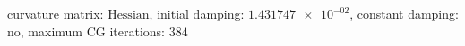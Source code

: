curvature matrix: $\text{Hessian}$, initial damping: $\num[scientific-notation=true]{1.431747e-02}$, constant damping: $\text{no}$, maximum CG iterations: $\num[scientific-notation=false]{384}$